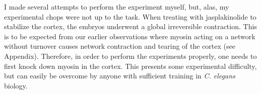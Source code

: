I made several attempts to perform the experiment myself, but, alas, my experimental chops were not up to the task.  When treating with jasplakinolide to stabilize the cortex, the embryos underwent a global irreversible contraction. This is to be expected from our earlier observations where myosin acting on a network without turnover causes network contraction and tearing of the cortex (see Appendix). Therefore, in order to perform the experiments properly, one needs to first knock down myosin in the cortex.  This presents some experimental difficulty, but can easily be overcome by anyone with sufficient training in \textit{C. elegans} biology.
